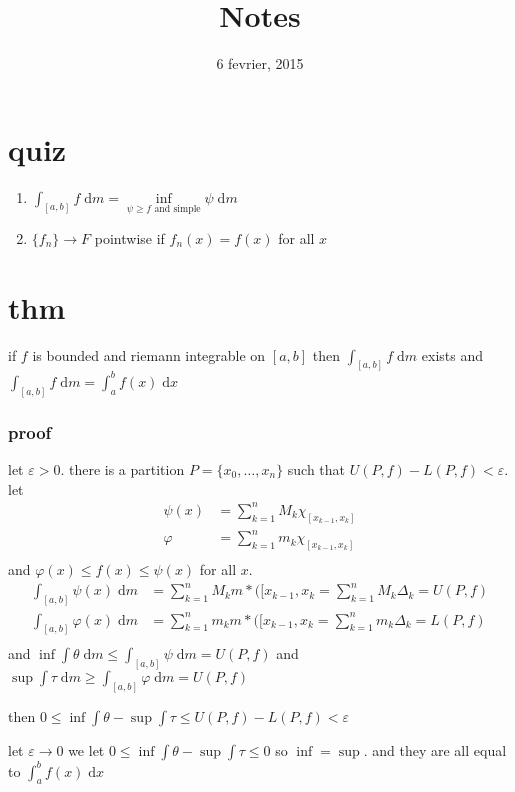 \documentclass[letterpaper]{article}
\begin{document}
\title{Notes}
\date{6 fevrier, 2015}
\maketitle
\section*{quiz}
\begin{enumerate}
\item
$\int_{[a,b]}{f\;\mathrm{d}m}=\inf\limits_{\psi\ge f\text{ and simple}}\psi\;\mathrm{d}m$
\item
$\{f_n\}\to F$ pointwise if $f_n(x)=f(x)$ for all $x$
\end{enumerate}
\section*{thm}
if $f$ is bounded and riemann integrable on $[a,b]$ then $\int_{[a,b]}f\;\mathrm{d}m$ exists and $\int_{[a,b]}{f\;\mathrm{d}m}=\int_{a}^b{f(x)\;\mathrm{d}x}$
\subsubsection*{proof}
let $\varepsilon>0$. there is a partition $P=\{x_0,\dots,x_n\}$ such that $U(P,f)-L(P,f)<\varepsilon$. let
\begin{align*}
  \psi(x)&=\sum\limits_{k=1}^n{M_k\chi_{[x_{k-1},x_k]}}\\
  \varphi&=\sum\limits_{k=1}^n{m_k\chi_{[x_{k-1},x_k]}}\\
\end{align*}
and $\varphi(x)\le f(x)\le \psi(x)$ for all $x$.
\begin{align*}
  \int_{[a,b]}{\psi(x)\;\mathrm{d}m}&=\sum\limits_{k=1}^n{M_km*([x_{k-1},x_k}=\sum\limits_{k=1}^n{M_k\Delta_k}=U(P,f)\\
  \int_{[a,b]}{\varphi(x)\;\mathrm{d}m}&=\sum\limits_{k=1}^n{m_km*([x_{k-1},x_k}=\sum\limits_{k=1}^n{m_k\Delta_k}=L(P,f)\\
\end{align*}
and $\inf\int{\theta\;\mathrm{d}m}\le\int_{[a,b]}{\psi\;\mathrm{d}m}=U(P,f)$
and $\sup\int{\tau\;\mathrm{d}m}\ge\int_{[a,b]}{\varphi\;\mathrm{d}m}=U(P,f)$

then $0\le \inf\int\theta-\sup\int\tau\le U(P,f)-L(P,f)<\varepsilon$

let $\varepsilon\to 0$ we let $0\le \inf\int\theta-\sup\int\tau\le 0$ so $\inf=\sup$. and they are all equal to $\int_{a}^b{f(x)\;\mathrm{d}x}$
\end{document}
